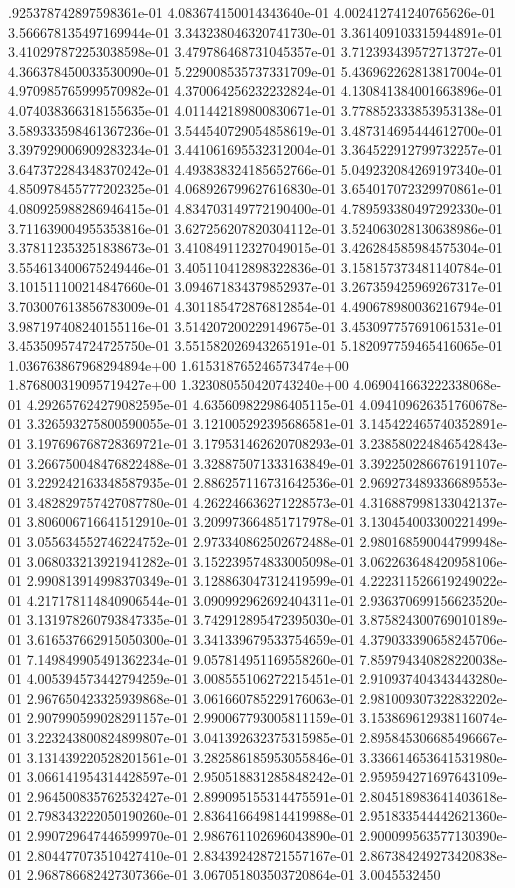 .925378742897598361e-01	4.083674150014343640e-01	4.002412741240765626e-01	3.566678135497169944e-01	3.343238046320741730e-01	3.361409103315944891e-01	3.410297872253038598e-01	3.479786468731045357e-01	3.712393439572713727e-01	4.366378450033530090e-01	5.229008535737331709e-01	5.436962262813817004e-01	4.970985765999570982e-01	4.370064256232232824e-01	4.130841384001663896e-01	4.074038366318155635e-01	4.011442189800830671e-01	3.778852333853953138e-01	3.589333598461367236e-01	3.544540729054858619e-01	3.487314695444612700e-01	3.397929006909283234e-01	3.441061695532312004e-01	3.364522912799732257e-01	3.647372284348370242e-01	4.493838324185652766e-01	5.049232084269197340e-01	4.850978455777202325e-01	4.068926799627616830e-01	3.654017072329970861e-01	4.080925988286946415e-01	4.834703149772190400e-01	4.789593380497292330e-01	3.711639004955353816e-01	3.627256207820304112e-01	3.524063028130638986e-01	3.378112353251838673e-01	3.410849112327049015e-01	3.426284585984575304e-01	3.554613400675249446e-01	3.405110412898322836e-01	3.158157373481140784e-01	3.101511100214847660e-01	3.094671834379852937e-01	3.267359425969267317e-01	3.703007613856783009e-01	4.301185472876812854e-01	4.490678980036216794e-01	3.987197408240155116e-01	3.514207200229149675e-01	3.453097757691061531e-01	3.453509574724725750e-01	3.551582026943265191e-01	5.182097759465416065e-01	1.036763867968294894e+00	1.615318765246573474e+00	1.876800319095719427e+00	1.323080550420743240e+00	4.069041663222338068e-01	4.292657624279082595e-01	4.635609822986405115e-01	4.094109626351760678e-01	3.326593275800590055e-01	3.121005292395686581e-01	3.145422465740352891e-01	3.197696768728369721e-01	3.179531462620708293e-01	3.238580224846542843e-01	3.266750048476822488e-01	3.328875071333163849e-01	3.392250286676191107e-01	3.229242163348587935e-01	2.886257116731642536e-01	2.969273489336689553e-01	3.482829757427087780e-01	4.262246636271228573e-01	4.316887998133042137e-01	3.806006716641512910e-01	3.209973664851717978e-01	3.130454003300221499e-01	3.055634552746224752e-01	2.973340862502672488e-01	2.980168590044799948e-01	3.068033213921941282e-01	3.152239574833005098e-01	3.062263648420958106e-01	2.990813914998370349e-01	3.128863047312419599e-01	4.222311526619249022e-01	4.217178114840906544e-01	3.090992962692404311e-01	2.936370699156623520e-01	3.131978260793847335e-01	3.742912895472395030e-01	3.875824300769010189e-01	3.616537662915050300e-01	3.341339679533754659e-01	4.379033390658245706e-01	7.149849905491362234e-01	9.057814951169558260e-01	7.859794340828220038e-01	4.005394573442794259e-01	3.008555106272215451e-01	2.910937404343443280e-01	2.967650423325939868e-01	3.061660785229176063e-01	2.981009307322832202e-01	2.907990599028291157e-01	2.990067793005811159e-01	3.153869612938116074e-01	3.223243800824899807e-01	3.041392632375315985e-01	2.895845306685496667e-01	3.131439220528201561e-01	3.282586185953055846e-01	3.336614653641531980e-01	3.066141954314428597e-01	2.950518831285848242e-01	2.959594271697643109e-01	2.964500835762532427e-01	2.899095155314475591e-01	2.804518983641403618e-01	2.798343222050190260e-01	2.836416649814419988e-01	2.951833544442621360e-01	2.990729647446599970e-01	2.986761102696043890e-01	2.900099563577130390e-01	2.804477073510427410e-01	2.834392428721557167e-01	2.867384249273420838e-01	2.968786682427307366e-01	3.067051803503720864e-01	3.0045532450